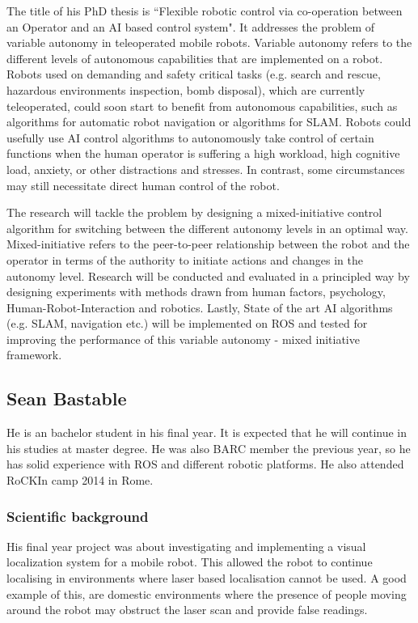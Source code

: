 \documentclass[conference]{IEEEtran}
\begin{document}
The title of his PhD thesis is ``Flexible robotic control via co-operation between an Operator and an AI based control system". It addresses the problem of variable autonomy in teleoperated mobile robots. Variable autonomy refers to the different levels of autonomous capabilities that are implemented on a robot. Robots used on demanding and safety critical tasks (e.g. search and rescue, hazardous environments inspection, bomb disposal), which are currently teleoperated, could soon start to benefit from autonomous capabilities, such as algorithms for automatic robot navigation or algorithms for SLAM. Robots could usefully use AI control algorithms to autonomously take control of certain functions when the human operator is suffering a high workload, high cognitive load, anxiety, or other distractions and stresses. In contrast, some circumstances may still necessitate direct human control of the robot.

The research will tackle the problem by designing a mixed-initiative control algorithm for switching between the different autonomy levels in an optimal way. Mixed-initiative refers to the peer-to-peer relationship between the robot and the operator in terms of the authority to initiate actions and changes in the autonomy level. Research will be conducted and evaluated in a principled way by designing experiments with methods drawn from human factors, psychology, Human-Robot-Interaction and robotics. Lastly, State of the art AI algorithms (e.g. SLAM, navigation etc.) will be implemented on ROS and tested for improving the performance of this variable autonomy - mixed initiative framework.

\subsection{Sean Bastable}

He is an bachelor student in his final year. It is expected that he will continue in his studies at master degree. He was also BARC member the previous year, so he has solid experience with ROS and different robotic platforms. He also attended RoCKIn camp 2014 in Rome.

\subsubsection*{Scientific background}
 
His final year project was about investigating and implementing a visual localization system for a mobile robot. This allowed the robot to continue localising in environments where laser based localisation cannot be used. A good example of this, are domestic environments where the presence of people moving around the robot may obstruct the laser scan and provide false readings.
 
\end{document}
